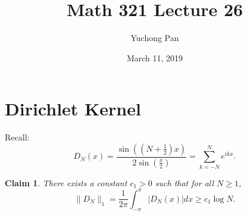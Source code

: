 \documentclass[letterpaper, reqno,11pt]{article}
\begin{document}
\title{Math 321 Lecture 26}
\author{Yuchong Pan}
\date{March 11, 2019}
\newtheorem{thm}{Theorem}
\newtheorem{defn}{Definition}
\newtheorem*{remark}{Remark}
\newtheorem{claim}{Claim}
\newtheorem{cor}{Corollary}
\newtheorem{lemma}{Lemma}
\newtheorem{prop}{Proposition}
\newtheorem{fact}{Fact}
\maketitle
%

\section{Dirichlet Kernel}

Recall:
\[ D_N(x) = \frac{\sin\left(\left(N + \frac{1}{2}\right) x\right)}{2 \sin\left(\frac{x}{2}\right)} = \sum_{k = -N}^N e^{ikx}. \]

\begin{claim}
  \normalfont There exists a constant $c_1 > 0$ such that for all $N \geq 1$,
  \[ \lVert D_N \rVert_1 = \frac{1}{2\pi} \int_{-\pi}^\pi |D_N(x)| dx \geq c_1 \log N. \]
\end{claim}
\end{document}

